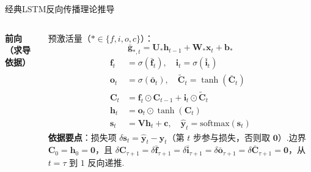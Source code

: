 \documentclass{模版}
\begin{document}
\begin{frame}{经典LSTM反向传播理论推导}
\scriptsize
\setlength{\abovedisplayskip}{3pt}\setlength{\belowdisplayskip}{3pt}%
\setlength{\abovedisplayshortskip}{1pt}\setlength{\belowdisplayshortskip}{1pt}%
\begin{columns}[T,onlytextwidth]
  \textbf{前向（求导依据）}\par\smallskip
  预激活量（$*\in\{f,i,o,c\}$）：
  \[\bar{\symbf{g}}_{*,t}=\symbf{U}_*\symbf{h}_{t-1}+\symbf{W}_*\symbf{x}_t+\symbf{b}_*\]
  \begin{align*}
    \symbf{f}_t&=\sigma(\bar{\symbf{f}}_t),\quad \symbf{i}_t=\sigma(\bar{\symbf{i}}_t)\\
    \symbf{o}_t&=\sigma(\bar{\symbf{o}}_t),\quad \tilde{\symbf{C}}_t=\tanh(\bar{\symbf{C}}_t)\\
    \symbf{C}_t&=\symbf{f}_t\odot\symbf{C}_{t-1}+\symbf{i}_t\odot\tilde{\symbf{C}}_t\\
    \symbf{h}_t&=\symbf{o}_t\odot\tanh(\symbf{C}_t)\\
    \symbf{s}_t&=\symbf{V}\symbf{h}_t+\symbf{c},\quad \hat{\symbf{y}}_t=\mathrm{softmax}(\symbf{s}_t)
  \end{align*}
  \textbf{依据要点}：损失项 $\delta\symbf{s}_t=\hat{\symbf{y}}_t-\symbf{y}_t$（第 $t$ 步参与损失，否则取 $\symbf{0}$）.边界 $\symbf{C}_0=\symbf{h}_0=\symbf{0}$，且
  $\delta\symbf{C}_{\tau+1}=\delta\bar{\symbf{f}}_{\tau+1}=\delta\bar{\symbf{i}}_{\tau+1}=\delta\bar{\symbf{o}}_{\tau+1}=\delta\bar{\symbf{C}}_{\tau+1}=\symbf{0}$，从 $t=\tau$ 到 $1$ 反向递推.


\end{columns}
\end{frame}
\end{document}
